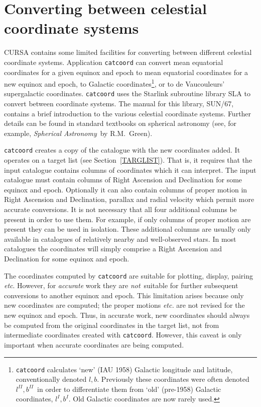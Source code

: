 \documentclass[twoside,11pt]{article}
\newcommand{\xref}[3]{#1}
\newcommand{\xlabel}[1]{}
\renewcommand{\_}{\texttt{\symbol{95}}}
\begin{document}
\section{\xlabel{CONCOORD}\label{CONCOORD}Converting between celestial
coordinate systems}

CURSA contains some limited facilities for converting between different
celestial coordinate systems.  Application {\tt catcoord} can convert
mean equatorial coordinates for a given equinox and epoch to mean
equatorial coordinates for a new equinox and epoch, to Galactic
coordinates\footnote{{\tt catcoord} calculates `new' (IAU 1958)
Galactic longitude and latitude, conventionally denoted $l,b$.
Previously these coordinates were often denoted $l^{II},b^{II}$\,
in order to differentiate them from `old' (pre-1958) Galactic
coordinates, $l^{I},b^{I}$.  Old Galactic coordinates are now rarely
used.}, or to de Vaucouleurs' supergalactic coordinates.  {\tt catcoord}
uses the Starlink subroutine library SLA to convert between coordinate
systems.  The manual for this library, \xref{SUN/67}{sun67}{}\cite{SUN67},
contains a brief introduction to the various celestial coordinate systems.
Further details can be found in standard textbooks on spherical astronomy
(see, for example, {\it Spherical Astronomy}\, by R.M.~Green\cite{GREEN}).

{\tt catcoord} creates a copy of the catalogue with the new coordinates
added.  It operates on a target list (see Section~\ref{TARGLIST}).
That is, it requires that the input catalogue contains columns of
coordinates which it can interpret.  The input catalogue must contain
columns of Right Ascension and Declination for some equinox and epoch.
Optionally it can also contain columns of proper motion in Right
Ascension and Declination, parallax and radial velocity which permit
more accurate conversions.  It is not necessary that all four additional
columns be present in order to use them.  For example, if only columns
of proper motion are present they can be used in isolation.  These additional
columns are usually only available in catalogues of relatively nearby and
well-observed stars.  In most catalogues the coordinates will simply
comprise a Right Ascension and Declination for some equinox and epoch.

The coordinates computed by {\tt catcoord} are suitable for plotting,
display, pairing \emph{etc}.  However, for {\it accurate} work they are {\it
not}\, suitable for further subsequent conversions to another equinox
and epoch.  This limitation arises because only new coordinates are
computed; the proper motions \emph{etc.} are not revised for the new equinox
and epoch.  Thus, in accurate work, new coordinates should always be
computed from the original coordinates in the target list, not from
intermediate coordinates created with {\tt catcoord}.  However, this
caveat is only important when accurate coordinates are being computed.
\end{document}

